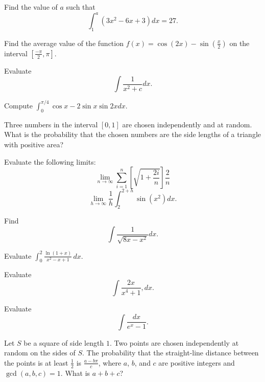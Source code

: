 \documentclass{article}
\begin{document}
\begin{prob}[SMT 2018/3]{3}
Find the value of $a$ such that
\[\int_1^a\left(3x^2-6x+3\right)dx=27.\]
\end{prob}

\begin{prob}{3}
Find the average value of the function $f(x)=\cos(2x)-\sin(\frac{x}{2})$ on the interval $[\frac{-\pi}{2},\pi]$.
\end{prob}

\begin{prob}[]{4}
Evaluate
\[\int \frac{1}{x^2+c}dx.\]
\end{prob}

\begin{prob}[SMT 2019/3]{4}
Compute $\int_0^{\pi/4}\cos x-2\sin x\sin 2x dx.$
\end{prob}

\begin{req}[AMC 12A 2016/23]{4}
Three numbers in the interval $[0,1]$ are chosen independently and at random. What is the probability that the chosen numbers are the side lengths of a triangle with positive area?
\end{req}

\begin{prob}{6}
Evaluate the following limits:
	\[\lim_{n \to \infty} \sum_{i = 1}^n\left[\sqrt{1+\frac{2i}{n}}\right]\frac{2}{n}\]
	\[\lim_{h \to \infty} \frac{1}{h}\int_{2}^{2+h}\sin(x^2)dx.\]

\end{prob}

\begin{prob}{6}
Find
\[\int \frac{1}{\sqrt{8x-x^2}}dx.\]
\end{prob}

\begin{prob}{6}
Evaluate $\int_0^2\frac{\ln(1+x)}{x^2-x+1}\,dx$.
\end{prob}

\begin{prob}{6}
Evaluate \[\int \frac{2x}{x^4 + 1},dx.\]
\end{prob}

\begin{prob}[]{9}
Evaluate \[\int \frac{dx}{e^x - 1}.\]
\end{prob}

\begin{req}[AMC 10A 2015/25]{9}
Let $S$ be a square of side length $1$.  Two points are chosen independently at random on the sides of $S$.  The probability that the straight-line distance between the points is at least $\tfrac12$ is $\tfrac{a-b\pi}c$, where $a$, $b$, and $c$ are positive integers and $\gcd(a,b,c)=1$.  What is $a+b+c$?
\end{req}
\end{document}
